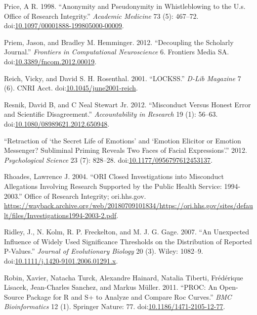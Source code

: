 \documentclass[a5paper]{book}
\begin{document}
\hypertarget{ref-doi:10.1097ux2f00001888-199805000-00009}{}
Price, A R. 1998. ``Anonymity and Pseudonymity in Whistleblowing to the
U.s. Office of Research Integrity.'' \emph{Academic Medicine} 73 (5):
467--72.
doi:\href{https://doi.org/10.1097/00001888-199805000-00009}{10.1097/00001888-199805000-00009}.

\hypertarget{ref-doi:10.3389ux2ffncom.2012.00019}{}
Priem, Jason, and Bradley M. Hemminger. 2012. ``Decoupling the Scholarly
Journal.'' \emph{Frontiers in Computational Neuroscience} 6. Frontiers
Media SA.
doi:\href{https://doi.org/10.3389/fncom.2012.00019}{10.3389/fncom.2012.00019}.

\hypertarget{ref-doi:10.1045ux2fjune2001-reich}{}
Reich, Vicky, and David S. H. Rosenthal. 2001. ``LOCKSS.'' \emph{D-Lib
Magazine} 7 (6). CNRI Acct.
doi:\href{https://doi.org/10.1045/june2001-reich}{10.1045/june2001-reich}.

\hypertarget{ref-doi:10.1080ux2f08989621.2012.650948}{}
Resnik, David B, and C Neal Stewart Jr. 2012. ``Misconduct Versus Honest
Error and Scientific Disagreement.'' \emph{Accountability in Research}
19 (1): 56--63.
doi:\href{https://doi.org/10.1080/08989621.2012.650948}{10.1080/08989621.2012.650948}.

\hypertarget{ref-doi:10.1177ux2f0956797612453137}{}
``Retraction of `the Secret Life of Emotions' and `Emotion Elicitor or
Emotion Messenger? Subliminal Priming Reveals Two Faces of Facial
Expressions'.'' 2012. \emph{Psychological Science} 23 (7): 828--28.
doi:\href{https://doi.org/10.1177/0956797612453137}{10.1177/0956797612453137}.

\hypertarget{ref-rhoades2004}{}
Rhoades, Lawrence J. 2004. ``ORI Closed Investigations into Misconduct
Allegations Involving Research Supported by the Public Health Service:
1994-2003.'' Office of Research Integrity; ori.hhs.gov.
\url{https://wayback.archive.org/web/20180709101834/https://ori.hhs.gov/sites/default/files/Investigations1994-2003-2.pdf}.

\hypertarget{ref-doi:10.1111ux2fj.1420-9101.2006.01291.x}{}
Ridley, J., N. Kolm, R. P. Freckelton, and M. J. G. Gage. 2007. ``An
Unexpected Influence of Widely Used Significance Thresholds on the
Distribution of Reported P-Values.'' \emph{Journal of Evolutionary
Biology} 20 (3). Wiley: 1082--9.
doi:\href{https://doi.org/10.1111/j.1420-9101.2006.01291.x}{10.1111/j.1420-9101.2006.01291.x}.

\hypertarget{ref-doi:10.1186ux2f1471-2105-12-77}{}
Robin, Xavier, Natacha Turck, Alexandre Hainard, Natalia Tiberti,
Frédérique Lisacek, Jean-Charles Sanchez, and Markus Müller. 2011.
``PROC: An Open-Source Package for R and S+ to Analyze and Compare Roc
Curves.'' \emph{BMC Bioinformatics} 12 (1). Springer Nature: 77.
doi:\href{https://doi.org/10.1186/1471-2105-12-77}{10.1186/1471-2105-12-77}.
\end{document}
